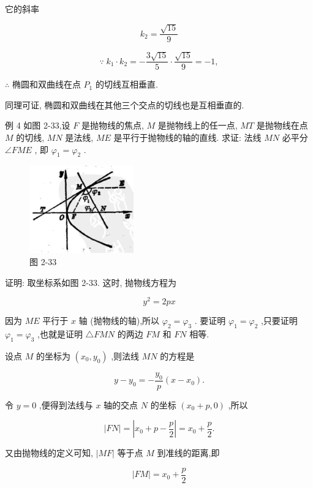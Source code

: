 \documentclass[lang=cn,newtx,12pt,scheme=chinese]{elegantbook}
\begin{document}
它的斜率

\[
    {k}_{2} = \frac{\sqrt{15}}{9}
\]

\[
  \because \;{k}_{1} \cdot {k}_{2} = - \frac{3\sqrt{15}}{5} \cdot \frac{\sqrt{15}}{9} = - 1,
\]

\(\therefore\) 椭圆和双曲线在点 \({P}_{1}\) 的切线互相垂直.

同理可证, 椭圆和双曲线在其他三个交点的切线也是互相垂直的.

例 4 如图 2-33,设 \(F\) 是抛物线的焦点, \(M\) 是抛物线上的任一点, \({MT}\) 是抛物线在点 \(M\) 的切线, \({MN}\) 是法线, \({ME}\) 是平行于抛物线的轴的直线. 求证: 法线 \({MN}\) 必平分 \(\angle {FME}\) , 即 \({\varphi }_{1} = {\varphi }_{2}\) .

\begin{figure}[h]
  \centering
  \includegraphics[max width=0.4\textwidth]{images/01912cc2-ffb6-728e-9ae7-b113ff05c64b_122_544824.jpg}
  \caption{图 2-33}
\end{figure}

证明: 取坐标系如图 2-33. 这时, 抛物线方程为

\[
    {y}^{2} = {2px}
\]

因为 \({ME}\) 平行于 \(x\) 轴 (抛物线的轴),所以 \({\varphi }_{2} = {\varphi }_{3}\) . 要证明 \({\varphi }_{1} = {\varphi }_{2}\) ,只要证明 \({\varphi }_{1} = {\varphi }_{3}\) ,也就是证明 \(\bigtriangleup {FMN}\) 的两边 \({FM}\) 和 \({FN}\) 相等.

设点 \(M\) 的坐标为 \(\left( {{x}_{0},{y}_{0}}\right)\) ,则法线 \({MN}\) 的方程是

\[
  y - {y}_{0} = - \frac{{y}_{0}}{p}\left( {x - {x}_{0}}\right) .
\]

令 \(y = 0\) ,便得到法线与 \(x\) 轴的交点 \(N\) 的坐标 \(\left( {{x}_{0} + p,0}\right)\) ,所以

\[
  \left| {FN}\right| = \left| {{x}_{0} + p - \frac{p}{2}}\right| = {x}_{0} + \frac{p}{2}.
\]

又由抛物线的定义可知, \(\left| {MF}\right|\) 等于点 \(M\) 到准线的距离,即

\[
  \left| {FM}\right| = {x}_{0} + \frac{p}{2}
\]
\end{document}
